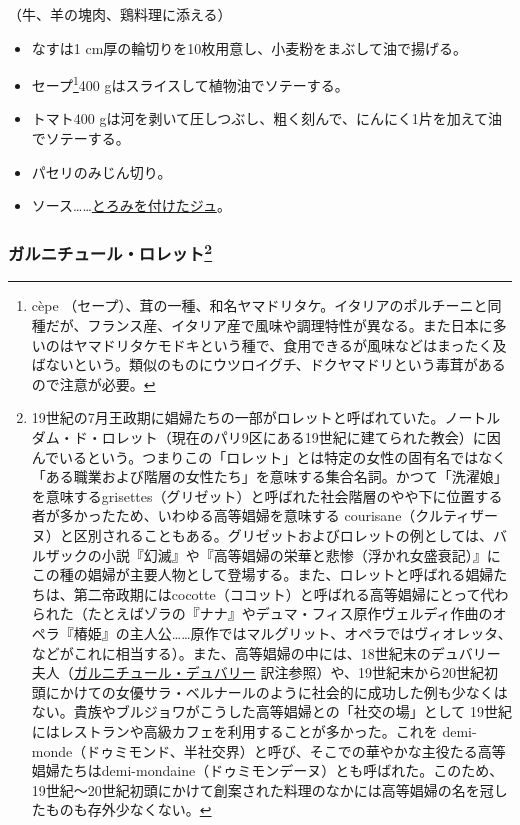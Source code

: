 \begin{recette}
（牛、羊の塊肉、鶏料理に添える）

\begin{itemize}
\item
  なすは1 cm厚の輪切りを10枚用意し、小麦粉をまぶして油で揚げる。
\item
  セープ\footnote{cèpe
    （セープ）、茸の一種、和名ヤマドリタケ。イタリアのポルチーニと同種だが、フランス産、イタリア産で風味や調理特性が異なる。また日本に多いのはヤマドリタケモドキという種で、食用できるが風味などはまったく及ばないという。類似のものにウツロイグチ、ドクヤマドリという毒茸があるので注意が必要。}400
  gはスライスして植物油でソテーする。
\item
  トマト400
  gは河を剥いて圧しつぶし、粗く刻んで、にんにく1片を加えて油でソテーする。
\item
  パセリのみじん切り。
\item
  ソース\ldots{}\ldots{}\protect\hyperlink{jus-de-veau-lie}{とろみを付けたジュ}。
\end{itemize}

\hypertarget{garniture-lorette}{%
\subsubsection[ガルニチュール・ロレット]{\texorpdfstring{ガルニチュール・ロレット\footnote{19世紀の7月王政期に娼婦たちの一部がロレットと呼ばれていた。ノートルダム・ド・ロレット（現在のパリ9区にある19世紀に建てられた教会）に因んでいるという。つまりこの「ロレット」とは特定の女性の固有名ではなく「ある職業および階層の女性たち」を意味する集合名詞。かつて「洗濯娘」を意味するgrisettes（グリゼット）と呼ばれた社会階層のやや下に位置する者が多かったため、いわゆる高等娼婦を意味する
  courisane（クルティザーヌ）と区別されることもある。グリゼットおよびロレットの例としては、バルザックの小説『幻滅』や『高等娼婦の栄華と悲惨（浮かれ女盛衰記）』にこの種の娼婦が主要人物として登場する。また、ロレットと呼ばれる娼婦たちは、第二帝政期にはcocotte（ココット）と呼ばれる高等娼婦にとって代わられた（たとえばゾラの『ナナ』やデュマ・フィス原作ヴェルディ作曲のオペラ『椿姫』の主人公\ldots{}\ldots{}原作ではマルグリット、オペラではヴィオレッタ、などがこれに相当する）。また、高等娼婦の中には、18世紀末のデュバリー夫人（\protect\hyperlink{garniture-dubarry}{ガルニチュール・デュバリー}
  訳注参照）や、19世紀末から20世紀初頭にかけての女優サラ・ベルナールのように社会的に成功した例も少なくはない。貴族やブルジョワがこうした高等娼婦との「社交の場」として
  19世紀にはレストランや高級カフェを利用することが多かった。これを
  demi-monde（ドゥミモンド、半社交界）と呼び、そこでの華やかな主役たる高等娼婦たちはdemi-mondaine（ドゥミモンデーヌ）とも呼ばれた。このため、19世紀〜20世紀初頭にかけて創案された料理のなかには高等娼婦の名を冠したものも存外少なくない。}}{ガルニチュール・ロレット}}\label{garniture-lorette}}


\end{recette}
